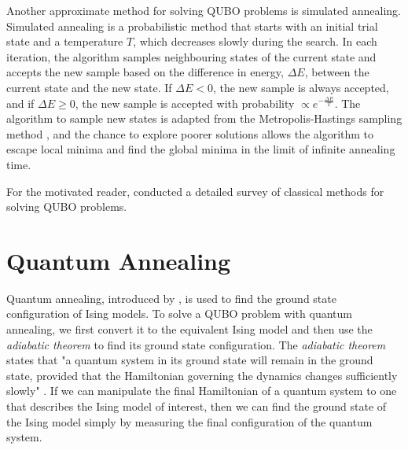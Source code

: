 Another approximate method for solving QUBO problems is simulated annealing. Simulated annealing \cite{Kirkpatrick} is a probabilistic method that starts with an initial trial state and a temperature $T$, which decreases slowly during the search. In each iteration, the algorithm samples neighbouring states of the current state and accepts the new sample based on the difference in energy, $\Delta E$, between the current state and the new state. If $\Delta E < 0$, the new sample is always accepted, and if $\Delta E \geq 0$, the new sample is accepted with probability $\propto e^{-\frac{\Delta E}{T}}$. The algorithm to sample new states is adapted from the Metropolis-Hastings sampling method \cite{metropolissampling}, and the chance to explore poorer solutions allows the algorithm to escape local minima and find the global minima in the limit of infinite annealing time.

For the motivated reader,  conducted a detailed survey of classical methods for solving QUBO problems.

\section{Quantum Annealing}\label{section:annealing}
Quantum annealing, introduced by , is used to find the ground state configuration of Ising models. To solve a QUBO problem with quantum annealing, we first convert it to the equivalent Ising model and then use the \textit{adiabatic theorem} to find its ground state configuration. The \textit{adiabatic theorem} states that "a quantum system in its ground state will remain in the ground state, provided that the Hamiltonian governing the dynamics changes sufficiently slowly" \cite{b15}. If we can manipulate the final Hamiltonian of a quantum system to one that describes the Ising model of interest, then we can find the ground state of the Ising model simply by measuring the final configuration of the quantum system.

